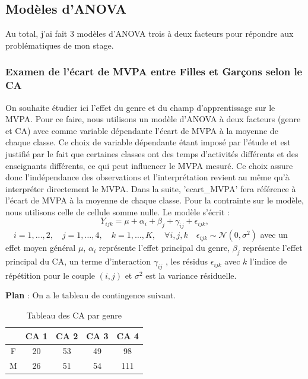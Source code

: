 \documentclass[12pt,a4paper]{article}
\begin{document}
	\subsection{Modèles d'ANOVA}
	Au total, j'ai fait 3 modèles d'ANOVA trois à deux facteurs pour répondre aux problématiques de mon stage.
	
	\subsubsection{Examen de l'écart de MVPA entre Filles et Garçons selon le CA}
	On souhaite étudier ici l'effet du genre et du champ d'apprentissage sur le MVPA. Pour ce faire, nous utilisons un modèle d'ANOVA à deux facteurs (genre et CA) avec comme variable dépendante l'écart de MVPA à la moyenne de chaque classe. Ce choix de variable dépendante étant imposé par l'étude et est justifié par le fait que certaines classes ont des temps d'activités différents et des enseignants différents, ce qui peut influencer le MVPA mesuré. Ce choix assure donc l'indépendance des observations et l'interprétation revient au même qu'à interpréter directement le MVPA. Dans la suite, 'ecart\_MVPA' fera référence à l'écart de MVPA à la moyenne de chaque classe.
	Pour la contrainte sur le modèle, nous utilisons celle de cellule somme nulle.
	Le modèle s'écrit : 
	\begin{equation}
		Y_{ijk} = \mu + \alpha_i + \beta_j + \gamma_{ij} + \epsilon_{ijk},
	\end{equation}
	$\quad i = 1, \ldots, 2, \quad j = 1, \ldots, 4, \quad k = 1, \ldots, K, \quad \forall i,j,k \quad \epsilon_{ijk} \sim \mathcal{N}(0,\sigma^2)$
	avec un effet moyen général $\mu$, $\alpha_i$ représente l'effet principal du genre, $\beta_j$ représente l'effet principal du CA, un terme d'interaction $\gamma_{ij}$ , les résidus $\epsilon_{ijk}$ avec $k$ l'indice de répétition pour le couple $(i,j)$ et $\sigma^2$ est la variance résiduelle.
	
	\textbf{Plan} :
	On a le tableau de contingence suivant.
	\begin{table}[H]
		\centering
		\begin{tabular}{ccccc}
			\toprule
			& CA 1 & CA 2 & CA 3 & CA 4 \\ 
			\midrule
			F & 20 & 53 & 49 & 98 \\ 
			M & 26 & 51 & 54 & 111 \\ 
			\bottomrule
		\end{tabular}
		\caption{Tableau des CA par genre}
		\label{tab:ca_gender}
	\end{table}
	
\end{document}
